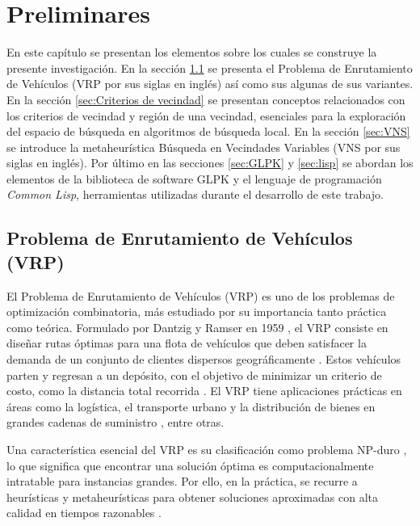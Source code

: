 \documentclass[12pt]{report}
\begin{document}
	\chapter{Preliminares}
	En este capítulo se presentan los elementos sobre los cuales se construye la presente investigación. En la sección \ref{sec:VRP} se presenta el Problema de Enrutamiento de Vehículos (VRP por sus siglas en inglés) así como sus algunas de sus variantes. En la sección \ref{sec:Criterios de vecindad} se presentan conceptos relacionados con los criterios de vecindad y región de una vecindad, esenciales para la exploración del espacio de búsqueda en algoritmos de búsqueda local. En la sección \ref{sec:VNS} se introduce la metaheurística Búsqueda en Vecindades Variables (VNS por sus siglas en inglés). Por último en las secciones \ref{sec:GLPK} y \ref{sec:lisp} se abordan los elementos de la biblioteca de software GLPK y el lenguaje de programación \textit{Common Lisp}, herramientas utilizadas durante el desarrollo de este trabajo.

	\section{Problema de Enrutamiento de Vehículos (VRP)}
	\label{sec:VRP}
	El Problema de Enrutamiento de Vehículos (VRP) es uno de los problemas de optimización combinatoria, más estudiado por su importancia tanto práctica como teórica. Formulado por Dantzig y Ramser en 1959 \cite{ref20}, el VRP consiste en diseñar rutas óptimas para una flota de vehículos que deben satisfacer la demanda de un conjunto de clientes dispersos geográficamente \cite{ref12}. Estos vehículos parten y regresan a un depósito, con el objetivo de minimizar un criterio de costo, como la distancia total recorrida \cite{ref5}. El VRP tiene aplicaciones prácticas en áreas como la logística, el transporte urbano y la distribución de bienes en grandes cadenas de suministro \cite{ref10, ref12, ref13}, entre otras.

	Una característica esencial del VRP es su clasificación como problema NP-duro \cite{ref21}, lo que significa que encontrar una solución óptima es computacionalmente intratable para instancias grandes. Por ello, en la práctica, se recurre a heurísticas y metaheurísticas para obtener soluciones aproximadas con alta calidad en tiempos razonables \cite{ref9}.
\end{document}
